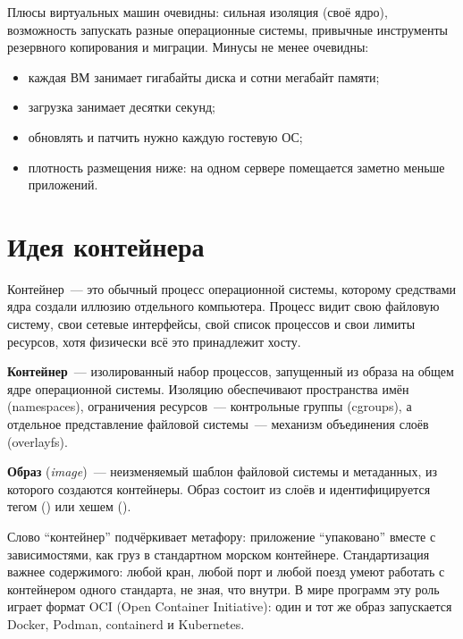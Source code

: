 Плюсы виртуальных машин очевидны: сильная изоляция (своё ядро),
возможность запускать разные операционные системы, привычные инструменты
резервного копирования и миграции. Минусы не менее очевидны:

\begin{itemize}
  \item каждая ВМ занимает гигабайты диска и сотни мегабайт памяти;
  \item загрузка занимает десятки секунд;
  \item обновлять и патчить нужно каждую гостевую ОС;
  \item плотность размещения ниже: на одном сервере помещается
        заметно меньше приложений.
\end{itemize}

\section{Идея контейнера}

Контейнер~--- это обычный процесс операционной системы, которому
средствами ядра создали иллюзию отдельного компьютера. Процесс видит
свою файловую систему, свои сетевые интерфейсы, свой список процессов
и свои лимиты ресурсов, хотя физически всё это принадлежит хосту.

\begin{defbox}[title={Определение: контейнер}]
\textbf{Контейнер}~--- изолированный набор процессов, запущенный из образа
на общем ядре операционной системы. Изоляцию обеспечивают пространства
имён (namespaces), ограничения ресурсов~--- контрольные группы (cgroups),
а отдельное представление файловой системы~--- механизм объединения слоёв
(overlayfs).
\end{defbox}

\begin{defbox}[title={Определение: образ}]
\textbf{Образ} (\emph{image})~--- неизменяемый шаблон файловой системы
и метаданных, из которого создаются контейнеры. Образ состоит из слоёв
и идентифицируется тегом () или хешем ().
\end{defbox}

Слово \enquote{контейнер} подчёркивает метафору: приложение \enquote{упаковано}
вместе с зависимостями, как груз в стандартном морском контейнере.
Стандартизация важнее содержимого: любой кран, любой порт и любой поезд
умеют работать с контейнером одного стандарта, не зная, что внутри.
В мире программ эту роль играет формат OCI (Open Container Initiative):
один и тот же образ запускается Docker, Podman, containerd и Kubernetes.

